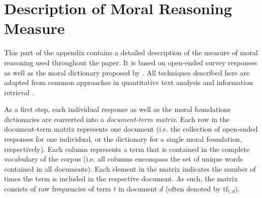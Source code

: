 \documentclass[12pt]{article}
\begin{document}
\clearpage
\section{Description of Moral Reasoning Measure}\label{app:measure}

This part of the appendix contains a detailed description of the measure of moral reasoning used throughout the paper. It is based on open-ended survey responses as well as the moral dictionary proposed by \citet{graham2009liberals}. All techniques described here are adapted from common approaches in quantitative text analysis and information retrieval \citep[see for exampe][for an introduction and from which much of the notation in this part of the appendix is adapted]{manning2008introduction}.

As a first step, each individual response as well as the moral foundations dictionaries are converted into a \textit{document-term matrix}. Each row in the document-term matrix represents one document (i.e. the collection of open-ended responses for one individual, or the dictionary for a single moral foundation, respectively). Each column represents a term that is contained in the complete vocabulary of the corpus (i.e. all columns encompass the set of unique words contained in all documents). Each element in the matrix indicates the number of times the term is included in the respective document. As such, the matrix consists of raw frequencies of term $t$ in document $d$ (often denoted by tf$_{t,d}$).
\end{document}
